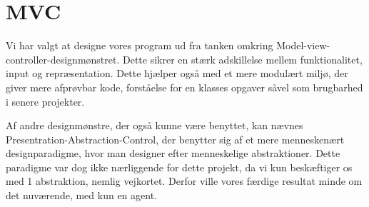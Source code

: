 \section{MVC}
Vi har valgt at designe vores program ud fra tanken omkring Model-view-controller-designmønstret. Dette sikrer en stærk adskillelse mellem funktionalitet, input og repræsentation. Dette hjælper også med et mere modulært miljø, der giver mere afprøvbar kode, forståelse for en klasses opgaver såvel som brugbarhed i senere projekter. 

Af andre designmønstre, der også kunne være benyttet, kan nævnes Presentration-Abstraction-Control, der benytter sig af et mere menneskenært designparadigme, hvor man designer efter menneskelige abstraktioner. Dette paradigme var dog ikke nærliggende for dette projekt, da vi kun beskæftiger os med 1 abstraktion, nemlig vejkortet. Derfor ville vores færdige resultat minde om det nuværende, med kun en agent.